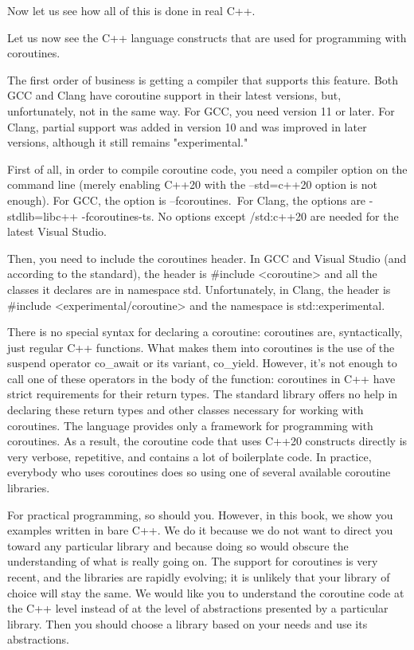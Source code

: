 Now let us see how all of this is done in real C++.


Let us now see the C++ language constructs that are used for programming with coroutines. 

The first order of business is getting a compiler that supports this feature. Both GCC and Clang have coroutine support in their latest versions, but, unfortunately, not in the same way. For GCC, you need version 11 or later. For Clang, partial support was added in version 10 and was improved in later versions, although it still remains "experimental."

First of all, in order to compile coroutine code, you need a compiler option on the command line (merely enabling C++20 with the --std=c++20 option is not enough). For GCC, the option is –fcoroutines. For Clang, the options are -stdlib=libc++ -fcoroutines-ts. No options except /std:c++20 are needed for the latest Visual Studio.

Then, you need to include the coroutines header. In GCC and Visual Studio (and according to the standard), the header is \#include <coroutine> and all the classes it declares are in namespace std. Unfortunately, in Clang, the header is \#include <experimental/coroutine> and the namespace is std::experimental. 

There is no special syntax for declaring a coroutine: coroutines are, syntactically, just regular C++ functions. What makes them into coroutines is the use of the suspend operator co\_await or its variant, co\_yield. However, it's not enough to call one of these operators in the body of the function: coroutines in C++ have strict requirements for their return types. The standard library offers no help in declaring these return types and other classes necessary for working with coroutines. The language provides only a framework for programming with coroutines. As a result, the coroutine code that uses C++20 constructs directly is very verbose, repetitive, and contains a lot of boilerplate code. In practice, everybody who uses coroutines does so using one of several available coroutine libraries. 

For practical programming, so should you. However, in this book, we show you examples written in bare C++. We do it because we do not want to direct you toward any particular library and because doing so would obscure the understanding of what is really going on. The support for coroutines is very recent, and the libraries are rapidly evolving; it is unlikely that your library of choice will stay the same. We would like you to understand the coroutine code at the C++ level instead of at the level of abstractions presented by a particular library. Then you should choose a library based on your needs and use its abstractions.


